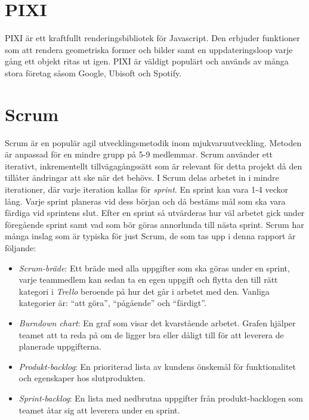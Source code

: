 \section{PIXI}
PIXI är ett kraftfullt renderingsbibliotek för Javascript.\cite{Pixi} Den erbjuder funktioner som att rendera geometriska former och bilder samt en uppdateringsloop varje gång ett objekt ritas ut igen. PIXI är väldigt populärt och används av många stora företag såsom Google, Ubisoft och Spotify.

\section{Scrum}
\label{theory:scrum}
Scrum är en populär agil utvecklingsmetodik inom mjukvaruutveckling. Metoden är anpassad för en mindre grupp på 5-9 medlemmar. Scrum använder ett iterativt, inkrementellt tillvägagångssätt som är relevant för detta projekt då den tillåter ändringar att ske när det behövs.\cite{TheScrum} I Scrum delas arbetet in i mindre iterationer, där varje iteration kallas för \textit{sprint}. En sprint kan vara 1-4 veckor lång. Varje sprint planeras vid dess början och då bestäms mål som ska vara färdiga vid sprintens slut. Efter en sprint så utvärderas hur väl arbetet gick under föregående sprint samt vad som bör göras annorlunda till nästa sprint. Scrum har många inslag som är typiska för just Scrum, de som tas upp i denna rapport är följande:

\begin{itemize}
	\item \textit{Scrum-bräde}: Ett bräde med alla uppgifter som ska göras under en sprint, varje teammedlem kan sedan ta en egen uppgift och flytta den till rätt kategori i \textit{Trello} beroende på hur det går i arbetet med den. Vanliga kategorier är: ``att göra'', ``pågående'' och ``färdigt''.

	\item \textit{Burndown chart}: En graf som visar det kvarstående arbetet. Grafen hjälper teamet att ta reda på om de ligger bra eller dåligt till för att leverera de planerade uppgifterna.

	\item \textit{Produkt-backlog}: En prioriterad lista av kundens önskemål för funktionalitet och egenskaper hos slutprodukten.

	\item \textit{Sprint-backlog}: En lista med nedbrutna uppgifter från produkt-backlogen som teamet åtar sig att leverera under en sprint.

\end{itemize}

